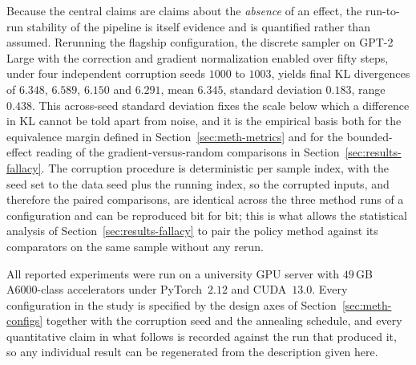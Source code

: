 Because the central claims are claims about the \emph{absence} of an effect, the run-to-run stability of the pipeline is itself evidence and is quantified rather than assumed. Rerunning the flagship configuration, the discrete sampler on GPT-2 Large with the correction and gradient normalization enabled over fifty steps, under four independent corruption seeds $1000$ to $1003$, yields final KL divergences of $6.348$, $6.589$, $6.150$ and $6.291$, mean $6.345$, standard deviation $0.183$, range $0.438$.
This across-seed standard deviation fixes the scale below which a difference in KL cannot be told apart from noise, and it is the empirical basis both for the equivalence margin defined in Section~\ref{sec:meth-metrics} and for the bounded-effect reading of the gradient-versus-random comparisons in Section~\ref{sec:results-fallacy}. The corruption procedure is deterministic per sample index, with the seed set to the data seed plus the running index, so the corrupted inputs, and therefore the paired comparisons, are identical across the three method runs of a configuration and can be reproduced bit for bit; this is what allows the statistical analysis of Section~\ref{sec:results-fallacy} to pair the policy method against its comparators on the same sample without any rerun.

All reported experiments were run on a university GPU server with $49$\,GB A6000-class accelerators under PyTorch~$2.12$ and CUDA~$13.0$. Every configuration in the study is specified by the design axes of Section~\ref{sec:meth-configs} together with the corruption seed and the annealing schedule, and every quantitative claim in what follows is recorded against the run that produced it, so any individual result can be regenerated from the description given here.
